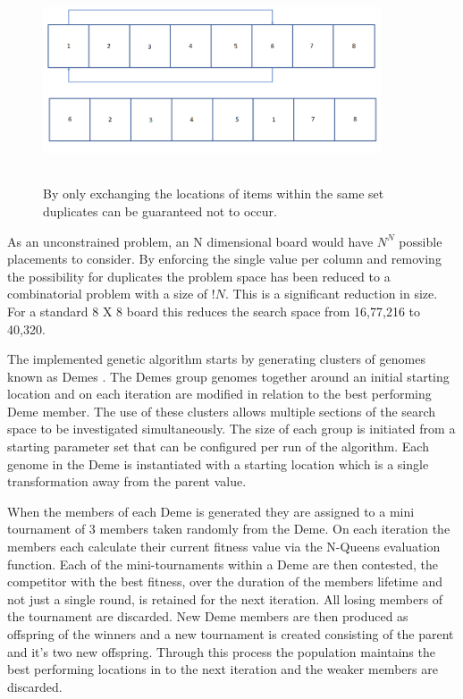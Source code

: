 \documentclass[conference]{IEEEtran}
\begin{document}
\begin{figure}[!htbp]
	\centering	
	\includegraphics[width=10cm, height=6cm]{SimpleCrossOver}
	\caption{By only exchanging the locations of items within the same set duplicates can be guaranteed not to occur.}
\end{figure}

As an unconstrained problem, an N dimensional board would have $N^N$ possible placements to consider. By enforcing the single value per column and removing the possibility for duplicates the problem space has been reduced to a combinatorial problem with a size of $!N$. This is a significant reduction in size. For a standard 8 X 8 board this reduces the search space from 16,77,216 to 40,320.

The implemented genetic algorithm starts by generating clusters of genomes known as Demes \cite{Demes}. The Demes group genomes together around an initial starting location and on each iteration are modified in relation to the best performing Deme member. The use of these clusters allows multiple sections of the search space to be investigated simultaneously. The size of each group is initiated from a starting parameter set that can be configured per run of the algorithm. Each genome in the Deme is instantiated with a starting location which is a single transformation away from the parent value. 

When the members of each Deme is generated they are assigned to a mini tournament of 3 members taken randomly from the Deme. On each iteration the members each calculate their current fitness value via the N-Queens evaluation function. Each of the mini-tournaments within a Deme are then contested, the competitor with the best fitness, over the duration of the members lifetime and not just a single round, is retained for the next iteration. All losing members of the tournament are discarded. New Deme members are then produced as offspring of the winners and a new tournament is created consisting of the parent and it's two new offspring. Through this process the population maintains the best performing locations in to the next iteration and the weaker members are discarded.
\end{document}
